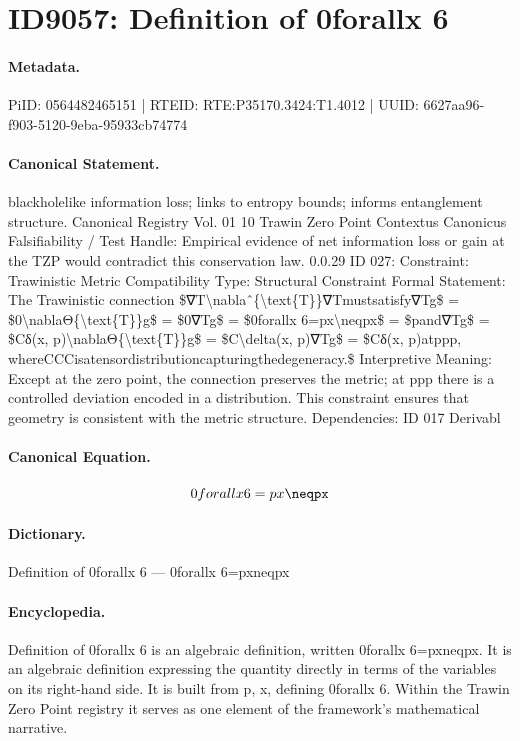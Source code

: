 \section*{ID9057: Definition of 0forallx 6}
\paragraph{Metadata.}
PiID: 0564482465151 | RTEID: RTE:P35170.3424:T1.4012 | UUID: 6627aa96-f903-5120-9eba-95933cb74774

\paragraph{Canonical Statement.}
blackholelike information loss; links to entropy bounds; informs entanglement structure. Canonical Registry Vol. 01 10 Trawin Zero Point Contextus Canonicus Falsifiability / Test Handle: Empirical evidence of net information loss or gain at the TZP would contradict this conservation law. 0.0.29 ID 027: Constraint: Trawinistic Metric Compatibility Type: Structural Constraint Formal Statement: The Trawinistic connection \$∇T\textbackslash{}nablaˆ\{\textbackslash{}text\{T\}\}∇Tmustsatisfy∇Tg\$ = \$0\textbackslash{}nablaΘ\{\textbackslash{}text\{T\}\}g\$ = \$0∇Tg\$ = \$0forallx 6=px\textbackslash{}neqpx\$ = \$pand∇Tg\$ = \$Cδ(x, p)\textbackslash{}nablaΘ\{\textbackslash{}text\{T\}\}g\$ = \$C\textbackslash{}delta(x, p)∇Tg\$ = \$Cδ(x, p)atppp, whereCCCisatensordistributioncapturingthedegeneracy.\$ Interpretive Meaning: Except at the zero point, the connection preserves the metric; at ppp there is a controlled deviation encoded in a distribution. This constraint ensures that geometry is consistent with the metric structure. Dependencies: ID 017 Derivabl

\paragraph{Canonical Equation.}
\[
0forallx 6=px\neqpx
\]

\paragraph{Dictionary.}
Definition of 0forallx 6 — 0forallx 6=pxneqpx

\paragraph{Encyclopedia.}
Definition of 0forallx 6 is an algebraic definition, written 0forallx 6=pxneqpx. It is an algebraic definition expressing the quantity directly in terms of the variables on its right-hand side. It is built from p, x, defining 0forallx 6. Within the Trawin Zero Point registry it serves as one element of the framework's mathematical narrative.
